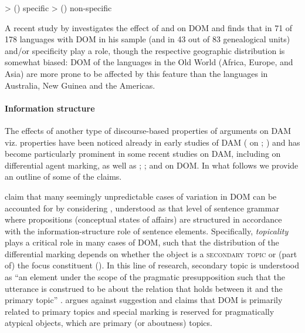 \documentclass[output=paper]{LSP/langsci}
\begin{document}
\ea\label{01-wi-ex:8:Hierarchy4}
 > () specific > () non-specific
\z

A recent study by \citet{Sinnemki2014Typological} investigates the effect of  and  on DOM and finds that in 71 of 178 languages with DOM in his sample (and in 43 out of 83 genealogical units)  and/or specificity play a role, though the respective geographic distribution is somewhat biased: DOM of the languages in the Old World (Africa, Europe, and Asia) are more prone to be affected by this feature than the languages in Australia, New Guinea and the Americas.

\paragraph*{Information structure}
\label{01-wi-sec:2.1.3.2-Information}

The effects of another type of discourse-based properties of arguments on DAM viz.  properties have been noticed already in early studies of DAM (\eg \citealt{Laca1987Sobre} on ; \citealt{Bossong1985Differentielle}) and has become particularly prominent in some recent studies on DAM, including \citet{McGregor1998Optional, McGregor1998Optional, McGregor2006Focal} on differential agent marking, as well as \citet{Iemmolo2010Topicality}; \citet{vonHeusingeretal2007Differential, vonHeusingeretal2011Affectedness}; \citet{Escandell-Vidal2009Differential} and \citet{Dalrympleetal2011Objects} on DOM. 
In what follows we provide an outline of some of the claims.

\citet[14]{Dalrympleetal2011Objects} claim that many seemingly unpredictable cases of variation in DOM can be accounted for by considering , understood as that level of sentence grammar where propositions (\ie conceptual states of affairs) are structured in accordance with the information-structure role of sentence elements. 
Specifically, \textit{topicality} plays a critical role in many cases of DOM, such that the distribution of the differential marking depends on whether the object is a \textsc{secondary topic} or (part of) the focus constituent (\citealt{Nikolaeva2001Secondary, Dalrympleetal2011Objects}).
 In this line of research, secondary topic is understood as “an element under the scope of the pragmatic presupposition such that the utterance is construed to be about the relation that holds between it and the primary topic” \citep[2]{Nikolaeva2001Secondary}. 
\citet{Iemmolo2010Topicality} argues against  suggestion and claims that DOM is primarily related to primary topics and special marking is reserved for pragmatically atypical objects, which are primary (or aboutness) topics. 
\end{document}
